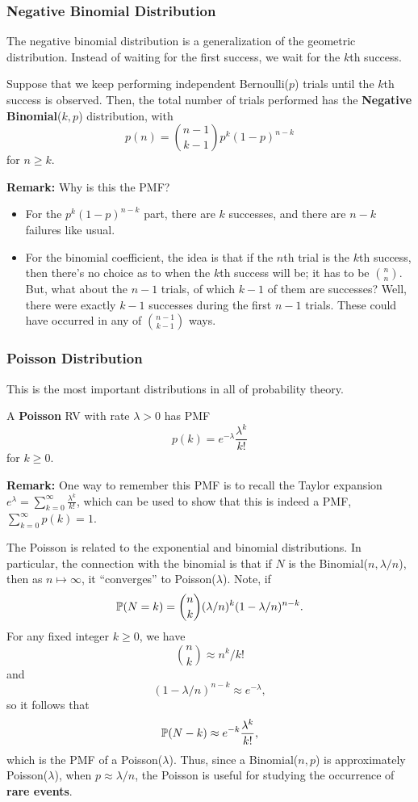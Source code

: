 \subsubsection{Negative Binomial Distribution}
The negative binomial distribution is a generalization of the geometric distribution. Instead of waiting for the first success, we wait for the $k$th success. 
\begin{definition}{}{}
    Suppose that we keep performing independent Bernoulli($p$) trials until the $k$th success is observed. Then, the total number of trials performed has the \textbf{Negative Binomial}($k, p$) distribution, with 
    \[p(n) = \binom{n - 1}{k - 1} p^k (1 - p)^{n - k}\]
    for $n \geq k$. 
\end{definition}
\textbf{Remark:} Why is this the PMF? 
\begin{itemize}
    \item For the $p^k (1 - p)^{n - k}$ part, there are $k$ successes, and there are $n - k$ failures like usual. 
    \item For the binomial coefficient, the idea is that if the $n$th trial is the $k$th success, then there's no choice as to when the $k$th success will be; it has to be $\binom{n}{n}$. But, what about the $n - 1$ trials, of which $k - 1$ of them are successes? Well, there were exactly $k - 1$ successes during the first $n - 1$ trials. These could have occurred in any of $\binom{n - 1}{k - 1}$ ways. 
\end{itemize}

\subsubsection{Poisson Distribution}
This is the most important distributions in all of probability theory. 
\begin{definition}{}{}
    A \textbf{Poisson} RV with rate $\lambda > 0$ has PMF 
    \[p(k) = e^{-\lambda} \frac{\lambda^k}{k!}\]
    for $k \geq 0$. 
\end{definition}
\textbf{Remark:} One way to remember this PMF is to recall the Taylor expansion $e^{\lambda} = \sum_{k = 0}^{\infty} \frac{\lambda^k}{k!}$, which can be used to show that this is indeed a PMF, $\sum_{k = 0}^{\infty} p(k) = 1$.

\bigskip 

The Poisson is related to the exponential and binomial distributions. In particular, the connection with the binomial is that if $N$ is the Binomial($n, \lambda / n$), then as $n \mapsto \infty$, it ``converges'' to Poisson($\lambda$). Note, if 
\[\mathbb{P}(N = k) = \binom{n}{k} (\lambda / n)^k (1 - \lambda / n)^{n - k}.\]
For any fixed integer $k \geq 0$, we have 
\[\binom{n}{k} \approx n^k / k!\]
and 
\[(1 - \lambda / n)^{n - k} \approx e^{-\lambda},\]
so it follows that 
\[\mathbb{P}(N - k) \approx e^{-k} \frac{\lambda^k}{k!},\]
which is the PMF of a Poisson($\lambda$). Thus, since a Binomial($n, p$) is approximately Poisson($\lambda$), when $p \approx \lambda / n$, the Poisson is useful for studying the occurrence of \textbf{rare events}. 

